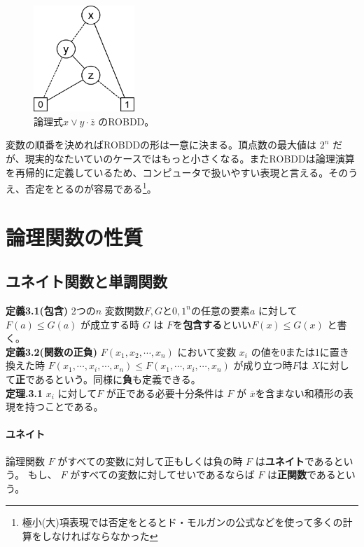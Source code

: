 \documentclass[a4j,10pt,oneside,openany,fleqn]{jsbook}
\begin{document}
\begin{figure}[h]
  \centering\includegraphics[height=4cm]{Images/ROBDD.png}
  \caption{論理式$x \vee y \cdot \overline{z}$ のROBDD。}
\end{figure}

変数の順番を決めればROBDDの形は一意に決まる。頂点数の最大値は $2^n$ だが、現実的なたいていのケースではもっと小さくなる。またROBDDは論理演算を再帰的に定義しているため、コンピュータで扱いやすい表現と言える。そのうえ、否定をとるのが容易である\footnote{極小(大)項表現では否定をとるとド・モルガンの公式などを使って多くの計算をしなければならなかった}。

\chapter{論理関数の性質}

\section{ユネイト関数と単調関数}

\textbf{定義3.1(包含)} 2つの$n$ 変数関数$F,G$と${0,1}^n$の任意の要素$a$ に対して $F(a) \leq G(a)$ が成立する時 $G$ は $F$を\textbf{包含する}といい$F(x) \leq G(x)$ と書く。\\
\textbf{定義3.2(関数の正負)} $F(x_1, x_2, \cdots, x_n)$ において変数 $x_i$ の値を0または1に置き換えた時 $F(x_1, \cdots, x_i, \cdots, x_n) \leq F(x_1, \cdots, x_i, \cdots, x_n)$ が成り立つ時$F$は $X$に対して\textbf{正}であるという。同様に\textbf{負}も定義できる。\\

\textbf{定理.3.1} $x_i$ に対して$F$ が正である必要十分条件は $F$ が $\overline{x}$を含まない和積形の表現を持つことである。\\

\subsubsection{ユネイト}
論理関数 $F$ がすべての変数に対して正もしくは負の時 $F$ は\textbf{ユネイト}であるという。
もし、 $F$ がすべての変数に対してせいであるならば $F$ は\textbf{正関数}であるという。
\end{document}
